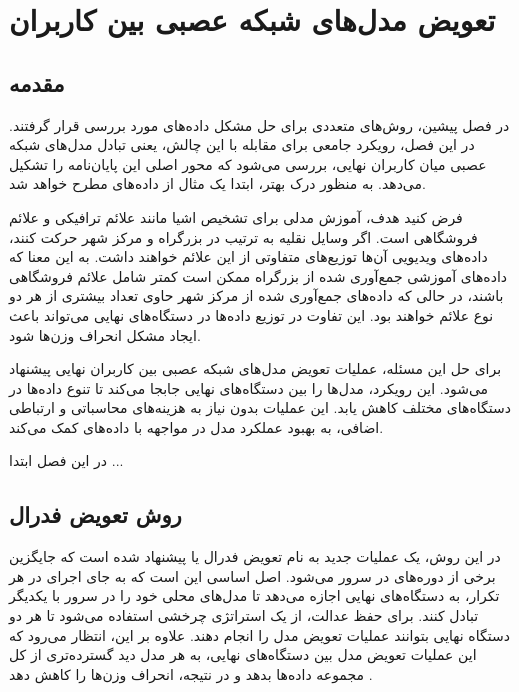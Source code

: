 \chapter{تعویض مدل‌های شبکه عصبی بین کاربران}

\section{مقدمه}
در فصل پیشین، روش‌های متعددی برای حل مشکل داده‌های
مورد بررسی قرار گرفتند. در این فصل، رویکرد جامعی برای مقابله با این چالش، یعنی تبادل مدل‌های شبکه عصبی میان کاربران نهایی، بررسی می‌شود که محور اصلی این پایان‌نامه را تشکیل می‌دهد. به منظور درک بهتر، ابتدا یک مثال از داده‌های
مطرح خواهد شد.

فرض کنید هدف، آموزش مدلی برای تشخیص اشیا مانند علائم ترافیکی و علائم فروشگاهی است. اگر وسایل نقلیه به ترتیب در بزرگراه و مرکز شهر حرکت کنند، داده‌های ویدیویی آن‌ها توزیع‌های متفاوتی از این علائم خواهند داشت. به این معنا که داده‌های آموزشی جمع‌آوری شده از بزرگراه ممکن است کمتر شامل علائم فروشگاهی باشند، در حالی که داده‌های جمع‌آوری شده از مرکز شهر حاوی تعداد بیشتری از هر دو نوع علائم خواهند بود. این تفاوت در توزیع داده‌ها در دستگاه‌های نهایی می‌تواند باعث ایجاد مشکل انحراف وزن‌ها شود.

برای حل این مسئله، عملیات تعویض مدل‌های شبکه عصبی بین کاربران نهایی پیشنهاد می‌شود. این رویکرد، مدل‌ها را بین دستگاه‌های نهایی جابجا می‌کند تا تنوع داده‌ها در دستگاه‌های مختلف کاهش یابد. این عملیات بدون نیاز به هزینه‌های محاسباتی و ارتباطی اضافی، به بهبود عملکرد مدل در مواجهه با داده‌های
کمک می‌کند.

در این فصل ابتدا ...

\section{
	روش تعویض فدرال%
}
در این روش، یک عملیات جدید به نام تعویض فدرال یا
پیشنهاد شده است که جایگزین برخی از دوره‌های
در سرور می‌شود. اصل اساسی
این است که به جای اجرای
در هر تکرار، به دستگاه‌های نهایی اجازه می‌دهد تا مدل‌های محلی خود را در سرور با یکدیگر تبادل کنند. برای حفظ عدالت، از یک استراتژی چرخشی استفاده می‌شود تا هر دو دستگاه نهایی بتوانند عملیات تعویض مدل را انجام دهند. علاوه بر این، انتظار می‌رود که این عملیات تعویض مدل بین دستگاه‌های نهایی، به هر مدل دید گسترده‌تری از کل مجموعه داده‌ها بدهد و در نتیجه، انحراف وزن‌ها را کاهش دهد
\cite{chiu2020semisupervised}.


